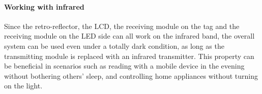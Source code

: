 \paragraph{Working with infrared}
Since the retro-reflector, the LCD, the receiving module on the tag and the receiving module on the LED side can all work on the infrared band, the overall system can be used even under a totally dark condition, as long as the transmitting module is replaced with an infrared transmitter. 
This property can be beneficial in scenarios such as reading with a mobile device in the evening without bothering others' sleep, and controlling home appliances without turning on the light. %





